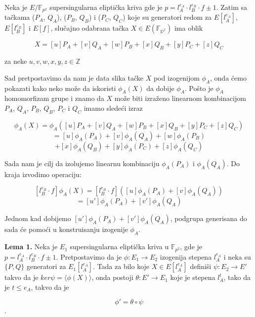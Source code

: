 \documentclass[a4paper]{article}
\begin{document}
Neka je $E/\mathbb{F}_{p^2}$ supersingularna eliptička kriva gde je  $p = l^{e_A}_{A} \cdot l^{e_B}_{B} \cdot f \pm 1$. Zatim sa tačkama ($P_A$, $Q_A$), ($P_B$, $Q_B$) i
($P_C$, $Q_C$) koje su generatori redom za $E[l^{e_A}_{A}]$, $E[l^{e_B}_{B}]$ i $E[f]$, slučajno odabrana tačka $X \in E(\mathbb{F_{p^2}})$ ima oblik

$$X = [u]P_A + [v]Q_A + [w]P_B + [x]Q_B + [y]P_C + [z]Q_C$$

\noindent za neke $u, v, w, x, y, z \in \mathbb{Z}$

Sad pretpostavimo da nam je data slika tačke $X$ pod izogenijom $\phi_A$, onda ćemo pokazati kako neko može da iskoristi $\phi_A(X)$ da dobije $\phi_A$. Pošto je $\phi_A$ homomorfizam grupe i znamo da $X$ može biti izraženo linearnom kombinacijom  $P_A$, $Q_A$, $P_B$, $Q_B$, $P_C$ i $Q_C$ imamo sledeći izraz

$$\phi_A(X) = \phi_A([u]P_A + [v]Q_A + [w]P_B + [x]Q_B + [y]P_C + [z]Q_C) $$
$$= [u]\phi_A(P_A) + [v]\phi_A(Q_A) + [w]\phi_A(P_B) $$
$$+ [x]\phi_A(Q_B) + [y]\phi_A(P_C) + [z]\phi_A(Q_C)$$


\noindent Sada nam je cilj da izolujemo linearnu kombinaciju $ \phi_A(P_A)$ i  $ \phi_A(Q_A)$. Do kraja izvodimo operaciju:

$$[l^{e_B}_{B} \cdot f]\phi_A(X) = [l^{e_B}_{B} \cdot f] ([u]\phi_A(P_A) + [v]\phi_A(Q_A))$$
$$= [u']\phi_A(P_A) + [v']\phi_A(Q_A)$$

Jednom kad dobijemo $ [u']\phi_A(P_A) + [v']\phi_A(Q_A)$, podgrupa generisana do sada će pomoći u konstruisanju izogenije $\phi_A$.


\textbf{Lema 1.} Neka je $E_1$ supersingularna eliptička kriva u $\mathbb{F}_{p^2}$, gde je $p = l^{e_A}_{A} \cdot l^{e_B}_{B} \cdot f \pm 1$. Pretpostavimo da je $\phi : E_1 \longrightarrow E_2$ izogenija stepena $l_A^{e_A}$ i  neka su $\{P, Q\}$ generatori za $E_1[l_A^{e_A}]$. Tada za bilo koje $X \in E[l_A^{e_A}]$ definiši $\psi : E_2 \longrightarrow E'$ takvo da je $ker \psi = \langle \phi(X) \rangle$, onda postoji $\theta: E' \longrightarrow E_1$ koje je stepena $l_A^t$, tako da je $t \leq e_A$, takvo da je 

$$\phi' = \theta \circ \psi$$.  
\end{document}
